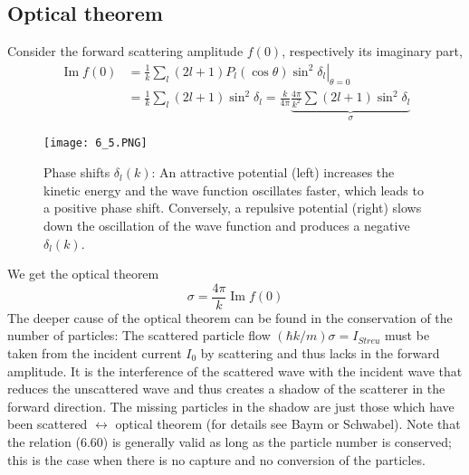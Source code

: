 \subsection{Optical theorem}
Consider the forward scattering amplitude $f (0)$, respectively its imaginary part,
\begin{equation}
\begin{aligned} \operatorname{Im} f(0) &=\left.\frac{1}{k} \sum_{l}(2 l+1) P_{l}(\cos \theta) \sin ^{2} \delta_{l}\right|_{\theta=0} \\ &=\frac{1}{k} \sum_{l}(2 l+1) \sin ^{2} \delta_{l}=\frac{k}{4 \pi} \underbrace{\frac{4 \pi}{k^{2}} \sum(2 l+1) \sin ^{2} \delta_{l}}_{\sigma} \end{aligned}
\end{equation}
\begin{figure}[ht]
    \centering
    \texttt{[image: 6\_5.PNG]}
    \caption{Phase shifts $\delta_l(k)$: An attractive potential (left) increases the kinetic energy and the wave function oscillates faster, which leads to a positive phase shift. Conversely, a repulsive potential (right) slows down the oscillation of the wave function and produces a negative $\delta_l(k)$.}
\end{figure}
We get the optical theorem
\begin{equation}
    \sigma=\frac{4 \pi}{k} \operatorname{Im} f(0)
    \end{equation}
The deeper cause of the optical theorem can be found in the conservation of the number of particles: The scattered particle flow $(\hbar k / m) \sigma = I_{Streu}$ must be taken from the incident current $I_0$ by scattering and thus lacks in the forward amplitude. It is the interference of the scattered wave with the incident wave that reduces the unscattered wave and thus creates a shadow of the scatterer in the forward direction. The missing particles in the shadow are just those which have been scattered $\leftrightarrow$ optical theorem (for details see Baym or Schwabel). Note that the relation (6.60) is generally valid as long as the particle number is conserved; this is the case when there is no capture and no conversion of the particles.

